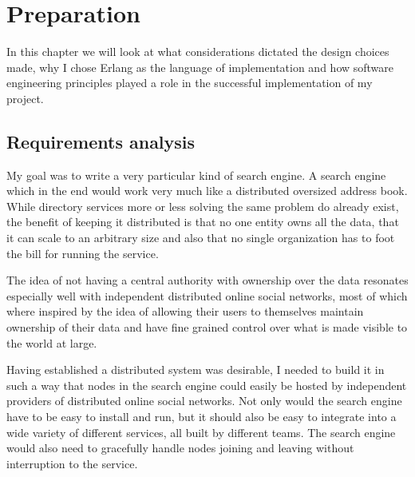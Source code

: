 

\section{Preparation}
In this chapter we will look at what considerations dictated the design choices made, why I chose Erlang as the language of implementation and how software engineering principles played a role in the successful implementation of my project.

\subsection{Requirements analysis}
My goal was to write a very particular kind of search engine. A search engine which in the end would work very much like a distributed oversized address book.
While directory services more or less solving the same problem do already exist, the benefit of keeping it distributed is that no one entity owns all the data, that it can scale to an arbitrary size and also that no single organization has to foot the bill for running the service.

The idea of not having a central authority with ownership over the data resonates especially well with independent distributed online social networks, most of which where inspired by the idea of allowing their users to themselves maintain ownership of their data and have fine grained control over what is made visible to the world at large.

Having established a distributed system was desirable, I needed to build it in such a way that nodes in the search engine could easily be hosted by independent providers of distributed online social networks. Not only would the search engine have to be easy to install and run, but it should also be easy to integrate into a wide variety of different services, all built by different teams. The search engine would also need to gracefully handle nodes joining and leaving without interruption to the service.

